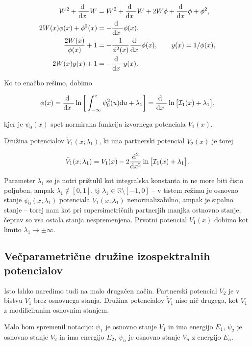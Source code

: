 \begin{align}
	W^2 + \frac{\text{d}^{}\ }{\text{d} x^{}\ } W &= W^2 + \frac{\text{d}^{}\ }{\text{d} x^{}\ } W + 2W\phi + \frac{\text{d}^{}\ }{\text{d} x^{}\ } \phi + \phi^2, \notag \\
	2W(x)\phi(x) + \phi^2(x) &= -\frac{\text{d}^{}\ }{\text{d} x^{}\ } \phi (x), \notag \\
	\frac{2W(x)}{\phi(x)} + 1 &= -\frac{1}{\phi^2(x)}\frac{\text{d}^{}\ }{\text{d} x^{}\ }\phi(x),\qquad y(x) = 1/\phi(x), \notag \\
	2W(x)y(x) + 1 &= -\frac{\text{d}^{}\ }{\text{d} x^{}\ } y(x).
\end{align}

\ni Ko to ena\v cbo re\v simo, dobimo

\begin{equation}
	\phi(x) = \frac{\text{d}^{}\ }{\text{d} x^{}\ } \ln \bigg[\int_{-\infty}^x \psi_0^2(u)\text{d} u + \lambda_1\bigg] =
		\frac{\text{d}^{}\ }{\text{d} x^{}\ } \ln \big[\mathcal{I}_1(x) + \lambda_1\big],
\end{equation}

\ni kjer je $\psi_0(x)$ spet normirana funkcija izvornega potenciala $V_1 (x)$.

Dru\v zina potencialov $\tilde{V}_1 (x; \lambda_1)$, ki ima partnerski potencial $V_2(x)$ je torej

\begin{equation}
	\tilde{V}_1 (x;\lambda_1) = V_1(x) - 2\frac{\text{d}^2}{\text{d} x^2}\ln\big[\mathcal{I}_1(x) + \lambda_1\big].
\end{equation}

\ni Parameter $\lambda_1$ se je notri pri\v stulil kot integralska konstanta in ne more biti \v cisto poljuben, ampak
$\lambda_1 \notin [0,1]$, tj $\lambda_1 \in \mathbb{R}\text{\textbackslash}[-1,0]$ -- v tistem re\v zimu je osnovno stanje
$\psi_0 (x; \lambda_1)$ potenciala $\tilde{V}_1(x; \lambda_1)$ nenormalizabilno, ampak je sipalno stanje -- torej
nam kot pri supersimetri\v cnih partnerjih manjka ostnovno stanje, \v ceprav so vsa ostala stanja nespremenjena.
Prvotni potencial $V_1(x)$ dobimo kot limito $\lambda_1 \to \pm \infty$.

\subsection{Ve\v cparametri\v cne dru\v zine izospektralnih potencialov}
Isto lahko naredimo tudi na malo druga\v cen na\v cin. Partnerski potencial $V_2$ je v bistvu $V_1$ brez osnovnega stanja.
Dru\v zina potencialov $\tilde{V}_1$ niso ni\v c drugega, kot $V_1$ z modificiranim osnovnim stanjem.

Malo bom spremenil notacijo: $\psi_1$ je osnovno stanje $V_1$ in ima energijo $E_1$, $\psi_2$ je osnovno stanje $V_2$ in
ima energijo $E_2$, $\psi_n$ je osnovno stanje $V_n$ z energijo $E_n$.

